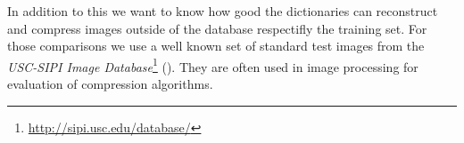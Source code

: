 In addition to this we want to know how good the dictionaries can reconstruct
and compress images outside of the database respectifly the training set. For
those comparisons we use a well known set of standard test images from the
\emph{USC-SIPI Image
Database}\footnote{\url{http://sipi.usc.edu/database/}}
(). They are often used in image processing for
evaluation of compression algorithms. 
\begin{figure}[h]
\centering
{}
\hspace{5mm}
\hspace{5mm}
\hspace{5mm}

\end{figure}
